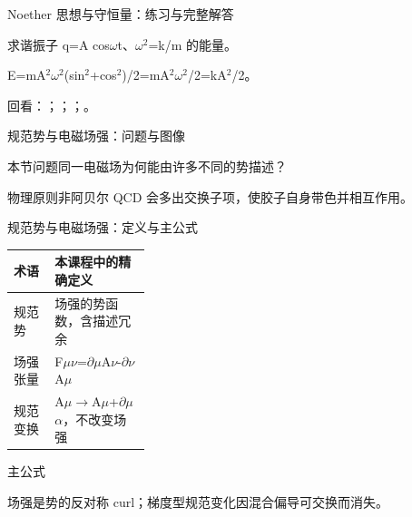 \begin{frame}[t]{Noether 思想与守恒量：练习与完整解答}
\footnotesize
\begin{block}{}求谐振子 q=A cos\ensuremath{\omega}t、\ensuremath{\omega}\ensuremath{^{2}}=k/\allowbreak{}m 的能量。\end{block}
\begin{exampleblock}{}E=mA\ensuremath{^{2}}\ensuremath{\omega}\ensuremath{^{2}}(sin\ensuremath{^{2}}+cos\ensuremath{^{2}})/\allowbreak{}2=mA\ensuremath{^{2}}\ensuremath{\omega}\ensuremath{^{2}}/\allowbreak{}2=kA\ensuremath{^{2}}/\allowbreak{}2。\end{exampleblock}
\vfill
\scriptsize 回看：；；；。
\end{frame}

\begin{frame}[t]{规范势与电磁场强：问题与图像}
\footnotesize
\begin{block}{本节问题}同一电磁场为何能由许多不同的势描述？\end{block}
\begin{block}{物理原则}\quad 非阿贝尔 QCD 会多出交换子项，使胶子自身带色并相互作用。\end{block}
\end{frame}

\begin{frame}[t]{规范势与电磁场强：定义与主公式}
\footnotesize\begin{tabularx}{\linewidth}{p{0.30\linewidth}Y}
\toprule 术语 & 本课程中的精确定义\\\midrule
{} 规范势 & 场强的势函数，含描述冗余\\
 场强张量 & F\ensuremath{\mu}\ensuremath{\nu}=\ensuremath{\partial}\ensuremath{\mu}A\ensuremath{\nu}-\ensuremath{\partial}\ensuremath{\nu}A\ensuremath{\mu}\\
 规范变换 & A\ensuremath{\mu}\ensuremath{\rightarrow}A\ensuremath{\mu}+\ensuremath{\partial}\ensuremath{\mu}\ensuremath{\alpha}，不改变场强\\
\bottomrule\end{tabularx}\vspace{0.15cm}
\begin{block}{ 主公式}\centering{}\end{block}
场强是势的反对称 curl；梯度型规范变化因混合偏导可交换而消失。
\end{frame}

